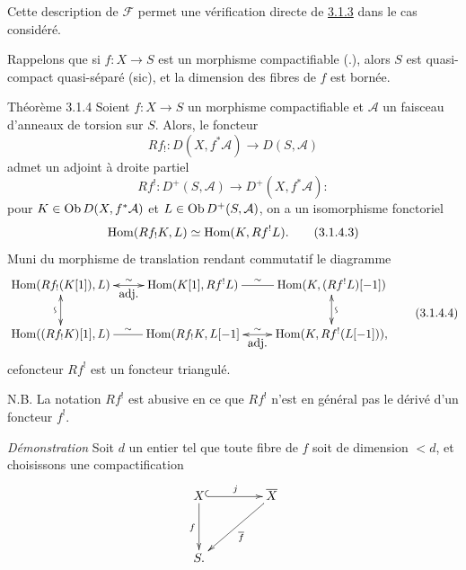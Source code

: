 \documentclass[10pt]{../fichiers-configuration-latex/smfart}
\begin{document}
Cette description de $ℱ$ permet une vérification directe de
\hyperref[XVIII.lem3.1.3]{3.1.3} dans le cas considéré.

Rappelons que si $f:X\rightarrow S$ est un morphisme compactifiable
(.), alors $S$ est quasi-compact quasi-séparé (sic), et la
dimension des fibres de $f$ est bornée.

\begin{enonce*}{Théorème 3.1.4}
Soient $f:X\rightarrow S$ un morphisme compactifiable et $\mathcal{A}$
un faisceau d'anneaux de torsion sur $S$. Alors, le foncteur
\begin{equation*}
Rf_{!}:D(X,f^{\ast}\mathcal{A})\longrightarrow D(S,\mathcal{A})\tag{3.1.4.1}
\end{equation*}%
admet un adjoint à droite partiel
\begin{equation*}
Rf^{!}:D^{+}(S,\mathcal{A})\longrightarrow D^{+}(X,f^{\ast}\mathcal{A}):\tag{3.1.4.2}
\end{equation*}%
pour $K\in \operatorname{Ob} D(X,f^{\ast}\mathcal{A})$ et $L\in \operatorname{Ob}
D^{+}(S,\mathcal{A})$, on a un isomorphisme fonctoriel 
\begin{equation*}
\operatorname{Hom}(Rf_{!}K,L)\simeq \operatorname{Hom}(K,Rf^{!}L){}.\tag{3.1.4.3}
\end{equation*}%
Muni du morphisme de translation rendant commutatif le diagramme 
\begin{equation*}
\vcenter{
\xymatrix{
  \Hom(Rf_!(K[1]),L)
  \ar@{<->}[d]_{\text{\rotatebox{90}{$\backsim$}}}\ar@{<->}[r]^-{\sim}_-{\txt{\rm adj.}}&
  \Hom(K[1],Rf^{!}L)\ar@{-}[r]^-\sim&
\Hom(K,(Rf^{!}L)[-1])\ar@{<->}[d]^{\text{\rotatebox{90}{$\backsim$}}}\\
\Hom((Rf_!K)[1],L)\ar@{-}[r]^-\sim & \Hom(Rf_!K,L[-1]
\ar@{<->}[r]^-{\sim}_-{\txt{\rm adj.}} & \Hom(K,Rf^{!}(L[-1])),
}}\tag{3.1.4.4}
\end{equation*}%
ce\pageoriginale foncteur $Rf^{!}$ est un foncteur triangulé.
\end{enonce*}

N.B. La notation $Rf^{!}$ est abusive en ce que $Rf^{!}$ n'est en
général pas le dérivé d'un foncteur $f^{!}$.

\noindent
\emph{Démonstration} Soit $d$ un entier tel que toute fibre de $f$
soit de dimension $<d$, et choisissons une compactification
$$
\xymatrix@R=1.25cm@C=1.5cm{
X \ar@{^{(}->}[r]^{j} \ar[d]_{f}& \bar{X}\ar[ld]^{\bar{f}}\\
S.
}
$$
\end{document}
